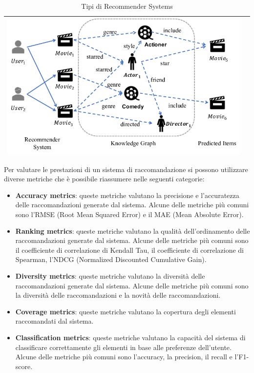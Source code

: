 \begin{table}[H]
\begin{tabularx}{\textwidth}{|X|X|}
        \includegraphics[width=\linewidth, trim=0 0 0 0]{images/knowledge.png} \\
        \hline
    \end{tabularx}
    \caption{Tipi di Recommender Systems}
\end{table}


\noindent Per valutare le prestazioni di un sistema di raccomandazione si possono utilizzare diverse metriche che è possibile riassumere nelle seguenti categorie:
\begin{itemize}
    \item \textbf{Accuracy metrics}: queste metriche valutano la precisione e l'accuratezza delle raccomandazioni generate dal sistema. Alcune delle metriche più comuni sono l'RMSE (Root Mean Squared Error) e il MAE (Mean Absolute Error).
    \item \textbf{Ranking metrics}: queste metriche valutano la qualità dell'ordinamento delle raccomandazioni generate dal sistema. Alcune delle metriche più comuni sono il coefficiente di correlazione di Kendall Tau, il coefficiente di correlazione di Spearman, l'NDCG (Normalized Discounted Cumulative Gain).
    \item \textbf{Diversity metrics}: queste metriche valutano la diversità delle raccomandazioni generate dal sistema. Alcune delle metriche più comuni sono la diversità delle raccomandazioni e la novità delle raccomandazioni.
    \item \textbf{Coverage metrics}: queste metriche valutano la copertura degli elementi raccomandati dal sistema.
    
    \item \textbf{Classification metrics}: queste metriche valutano la capacità del sistema di classificare correttamente gli elementi in base alle preferenze dell'utente. Alcune delle metriche più comuni sono l'accuracy, la precision, il recall e l'F1-score.
\end{itemize}

